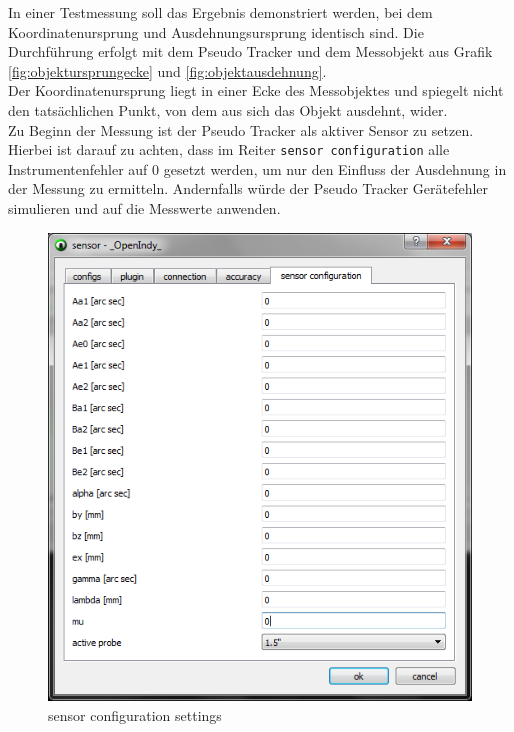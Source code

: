 In einer Testmessung soll das Ergebnis demonstriert werden, bei dem Koordinatenursprung und Ausdehnungsursprung identisch sind. Die Durchführung erfolgt mit dem Pseudo Tracker und dem Messobjekt aus Grafik \ref{fig:objektursprungecke} und \ref{fig:objektausdehnung}.\\
Der Koordinatenursprung liegt in einer Ecke des Messobjektes und spiegelt nicht den tatsächlichen Punkt, von dem aus sich das Objekt ausdehnt, wider.\\
Zu Beginn der Messung ist der Pseudo Tracker als aktiver Sensor zu setzen. Hierbei ist darauf zu achten, dass im Reiter \texttt{sensor configuration} alle Instrumentenfehler auf 0 gesetzt werden, um nur den Einfluss der Ausdehnung in der Messung zu ermitteln. Andernfalls würde der Pseudo Tracker Gerätefehler simulieren und auf die Messwerte anwenden.

\begin{figure}[h]
\label{fig:sensorconfig}
\centering
	\includegraphics[scale=2.0]{bilder/sensorconfig}
	\caption{sensor configuration settings}
\end{figure}


